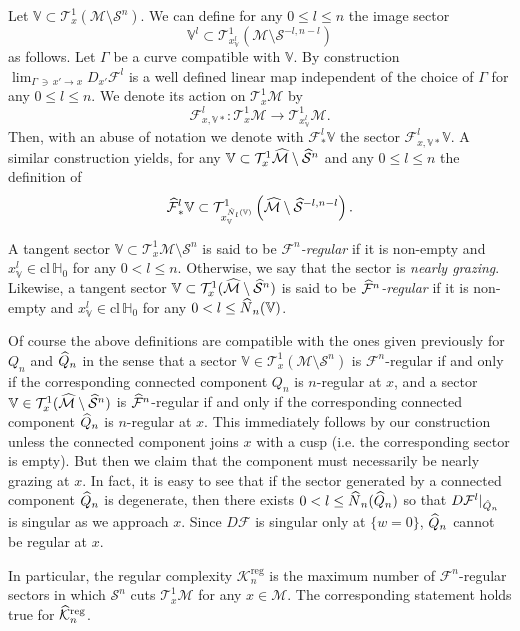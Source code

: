 \documentclass[10pt]{amsart}
\theoremstyle{definition}\newtheorem{defi}[theo]{Definition}\newtheorem{rema}[theo]{Remark}\newtheorem{exam}[theo]{Example}\newtheorem{exem}[theo]{Example}\newtheorem{nota}[theo]{Notation}
\newcommand{\cl}[1]{\mathrm{cl}\,#1}
\newcommand{\homo}{\mathbb{H}}
\newcommand{\tangu}{\mathcal{T}^1}
\newcommand{\cm}{\mathcal{F}}
\newcommand{\csp}{\mathcal{M}}
\newcommand{\cmp}{\hat\cm}
\newcommand{\cspi}{\widehat{\csp}}
\newcommand{\singPrivate}{\mathcal{S}}
\newcommand{\sing}[1]{\singPrivate^{#1}}
\newcommand{\singp}[1]{\hat{\singPrivate}^{#1}}
\newcommand{\ckreg}{\mathcal{K}^\text{reg}}
\newcommand{\ckregp}{\hat{\mathcal{K}}^\text{reg}}
\newcommand{\Np}{\hat N}
\newcommand{\cV}{\mathbb{V}}
\let\oldhat\hat
\renewcommand*{\hat}[1]{\mathchoice{\widehat{#1}}{\widehat{#1}}{\oldhat{#1}}{\oldhat{#1}}}
\begin{document}
Let $\cV\subset\tangu_{x}(\csp\setminus\sing n)$. We can define for any $0\le l\le n$ the image sector
\[
\cV^l\subset\tangu_{x^{l}_{\cV}}\left(\csp\setminus\sing{-l,n-l}\right)
\]
as follows. Let $\Gamma$ be a curve compatible with $\cV$. By construction
$\lim_{\Gamma\,\ni\,x'\to x}D_{x'}\cm^l$ is a well defined linear map independent of the choice of $\Gamma$ for any $0\le l\le n$. We denote its action on 
$\tangu_x\csp$ by 
\[
\cm_{x,\cV*}^{l}:\tangu_x\csp\to\tangu_{x^{l}_{\cV}}\csp.
\]
Then, with an abuse of notation we denote with $\cm^{l}_{*}\cV$ the sector $\cm^{l}_{x,\cV*}\cV$. A similar construction yields, for any $\cV\subset\tangu_{x}\cspi\setminus\singp n$ and any $0\le l\le n$ the definition of
\[
\cmp^{l}_{*}\cV\subset\tangu_{x^{\Np_l(\cV)}_{\cV}}\left(\cspi\setminus\singp{-l,n-l}\right).
\]

A tangent sector $\cV\subset\tangu_{x}\csp\setminus\sing n$ is said to be \emph{$\cm^n$-regular} if it is non-empty and $x_\cV^{l}\in\cl\homo_0$ for any $0 < l\le n$. Otherwise, we say that the sector is \emph{nearly grazing}. Likewise, a tangent sector $\cV\subset\tangu_{x}(\cspi\setminus\singp n)$ is said to be
\emph{$\cmp^n$-regular} if it is non-empty and $x_\cV^{l}\in\cl\homo_0$ for any $0 < l\le \Np_n(\cV)$.

Of course the above definitions are compatible with the ones given previously for $Q_n$ and $\hat Q_n$ in the sense that a sector $\cV\in\tangu_x(\csp\setminus\sing n)$ is $\cm^{n}$-regular if and only if the corresponding connected component $Q_n$ is $n$-regular at $x$, and a sector $\cV\in\tangu_x(\cspi\setminus\singp n)$ is $\cmp^{n}$-regular if and only if the corresponding connected component $\hat Q_n$ is $n$-regular at $x$. This immediately follows by our construction unless the connected component joins $x$ with a cusp (i.e. the corresponding sector is empty). But then we claim that the component must necessarily be nearly grazing at $x$. In fact, it is easy to see that if the sector generated by a connected component $\hat Q_n$ is degenerate, then there exists $0 < l\le \Np_n(\hat Q_n)$ so that $D\cm^l|_{\hat Q_n}$ is singular as we approach $x$. Since $D\cm$ is singular only at $\{w = 0\}$, $\hat Q_n$ cannot be regular at $x$.

In particular, the regular complexity $\ckreg_n$ is the maximum number of $\cm^{n}$-regular sectors in which $\sing n$ cuts $\tangu_x\csp$ for any $x\in\csp$. The corresponding statement holds true for $\ckregp_n$.
\end{document}
